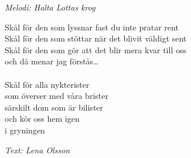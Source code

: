 {\footnotesize\textit{Melodi: Halta Lottas krog}}\par
\vspace{10pt}
Skål för den som lyssnar fast du inte pratar rent\\
Skål för den som stöttar när det blivit väldigt sent\\
Skål för den som gör att det blir mera kvar till oss\\
och då menar jag förstås…\\
\\
Skål för alla nykterister\\
som överser med våra brister\\
särskilt dom som är bilister\\
och kör oss hem igen\\
i gryningen
\par
\vspace{10pt}
{\footnotesize\textit{Text: Lena Olsson}}
